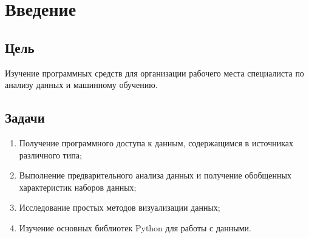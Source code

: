 \chapter{Введение}

\section{Цель}  

Изучение программных средств для
организации рабочего места специалиста по анализу данных и машинному
обучению.


\section{Задачи}

\begin{enumerate}
    \item Получение программного доступа к данным, содержащимся в источниках различного типа;
    \item Выполнение предварительного анализа данных и получение обобщенных характеристик наборов данных;
    \item Исследование простых методов визуализации данных;
    \item Изучение основных библиотек Python для работы с данными.

\end{enumerate}
  
\endinput 